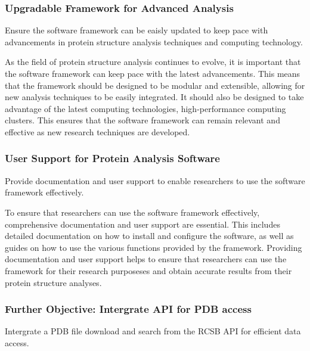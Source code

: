\documentclass[]{final_report}
\begin{document}
\subsubsection{Upgradable Framework for Advanced Analysis}

\begin{displayquote}
    Ensure the software framework can be eaisly updated to keep pace with advancements in protein structure analysis techniques and computing technology.
\end{displayquote}

As the field of protein structure analysis continues to evolve, it is important that the software framework can keep pace with the latest advancements. This means that the framework should be designed to be modular and extensible, allowing for new analysis techniques to be easily integrated. It should also be designed to take advantage of the latest computing technologies, high-performance computing clusters. This ensures that the software framework can remain relevant and effective as new research techniques are developed.

\subsubsection{User Support for Protein Analysis Software}

\begin{displayquote}
    Provide documentation and user support to enable researchers to use the software framework effectively.
\end{displayquote}

To ensure that researchers can use the software framework effectively, comprehensive documentation and user support are essential. This includes detailed documentation on how to install and configure the software, as well as guides on how to use the various functions provided by the framework. Providing documentation and user support helps to ensure that researchers can use the framework for their research purposeses and obtain accurate results from their protein structure analyses.

\subsubsection{Further Objective: Intergrate API for PDB access}

\begin{displayquote}
    Intergrate a PDB file download and search from the RCSB API for efficient data access.
\end{displayquote}
\end{document}
